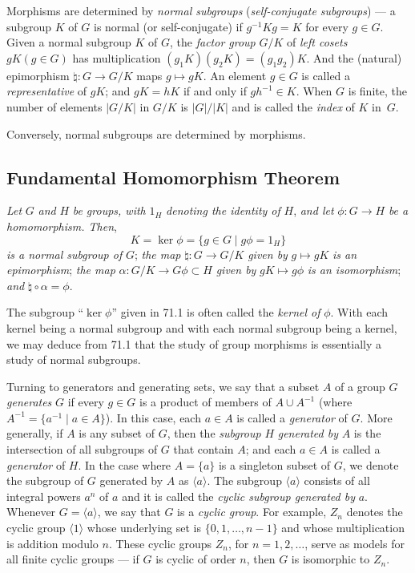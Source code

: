 \documentclass{surv-l}
\numberwithin{equation}{section}
\numberwithin{table}{section}
\numberwithin{figure}{section}
\theoremstyle{definition}
\begin{document}
Morphisms are determined by \emph{normal subgroups}
(\emph{self-conjugate subgroups}) --- a subgroup $K$ of $G$ is
normal (or self-conjugate) if $g^{-1}Kg=K$ for every $g\in G$.
Given a normal subgroup $K$ of $G$, the \emph{factor
group} $G/K$ of \emph{left cosets} $gK(g\in G)$ has multiplication
$(g_{1}K)(g_{2}K)=(g_{1}g_{2}) K$. And the (natural) epimorphism
$\natural : G\rightarrow G/K$ maps $g\mapsto gK$. An element
$g\in G$ is called a \emph{representative} of $gK$; and $gK=hK$ if and only if $ gh^{-1}\in K$. When
$G$ is finite, the number of elements $|G/K|$ in $G/K$ is
$|G|/|K|$ and is called the \emph{index} of $K$ in~$G$.

Conversely, normal subgroups are determined by morphisms.

\subsection{Fundamental Homomorphism Theorem}

\emph{Let} $G$ \emph{and} $H$ \emph{be groups, with} $1_{H}$
\emph{denoting the identity of} $H$, \emph{and let} $\phi :
G\rightarrow H$ \emph{be a homomorphism. Then},
\[
K=\ker \phi=\{g\in G\mid g\phi=1_{H}\}
\]
\emph{is a normal subgroup of} $G$; \emph{the map}
$\natural : G\rightarrow G/K$ \emph{given by} $g\mapsto gK$
\emph{is an epimorphism}; \emph{the map} $\alpha : G/K\rightarrow
G\phi\subset H$ \emph{given by} $gK\mapsto g\phi$ \emph{is an
isomorphism}; \emph{and} $\natural \circ \alpha=\phi$.

The subgroup ``$\ker \phi$'' given in 71.1 is often
called the \emph{kernel of} $\phi$. With each kernel being a
normal subgroup and with each normal subgroup being a kernel, we
may deduce from 71.1 that the study of group morphisms is
essentially a study of normal subgroups.

Turning to generators and generating sets, we say that a subset $A$
of a group $G$ \emph{generates} $G$ if every $g\in G$ is a product
of members of $A\cup A^{-1}$ (where $A^{-1}=\{a^{-1}\mid a\in
A\}$). In this case, each $a\in A$ is called a
\emph{generator} of $G$. More
generally, if $A$ is any subset of $G$, then the \emph{subgroup}
$H$ \emph{generated by} $A$ is the intersection of all subgroups
of $G$ that contain $A$; and each $a\in A$ is called a
\emph{generator} of $H$. In the case where $A=\{a\}$ is a singleton
subset of $G$, we denote the subgroup of $G$ generated by $A$ as
$\langle a\rangle$. The subgroup $\langle a\rangle$ consists of
all integral powers $a^{n}$ of $a$ and it is called the \emph{cyclic
subgroup generated by} $a$. Whenever $G=\langle a\rangle$, we say
that $G$ is a \emph{cyclic group}. For example, $Z_{n}$ denotes
the cyclic group $\langle 1\rangle$ whose underlying set is
$\{0,1,\ldots, n-1\}$ and whose multiplication is addition modulo
$n$. These cyclic groups $Z_{n}$, for $n =1,2, \ldots$, serve as
models for all finite cyclic groups --- if $G$ is cyclic of order
$n$, then $G$ is isomorphic to $Z_{n}$.
\end{document}
